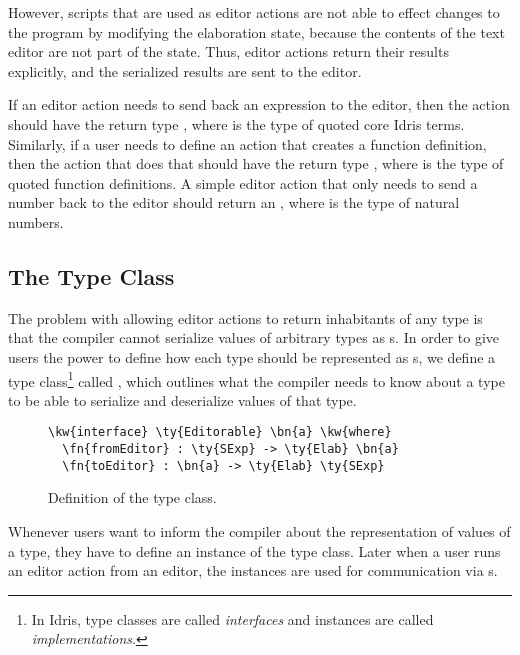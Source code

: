 However, \Elab{} scripts that are used as editor actions are not able to effect changes to the program by modifying the elaboration state, because the contents of the text editor are not part of the state.
Thus, editor actions return their results explicitly, and the serialized results are sent to the editor.

If an editor action needs to send back an expression to the editor, then the
action should have the return type \mbox{}, where  is the type of
quoted core Idris terms.
Similarly, if a user needs to define an action that creates a function definition,
then the action that does that should have the return type \mbox{},
where  is the type of quoted function definitions.
A simple editor action that only needs to send a number back
to the editor should return an \mbox{}, where  is the
type of natural numbers.

\subsection{The \Editorable{} Type Class}
\label{ssec:editorable}

The problem with allowing editor actions to return inhabitants of any
type is that the compiler cannot serialize values of arbitrary types
as \sexp{}s.  In order
to give users the power to define how each type should
be represented as \sexp{}s, we define a type class\footnote{In Idris,
  type classes are called \emph{interfaces} and instances are called
  \emph{implementations}.}  called \Editorable{}, which outlines what
the compiler needs to know about a type to be able to serialize and
deserialize values of that type.

\begin{figure}[H]
\begin{Verbatim}
\kw{interface} \ty{Editorable} \bn{a} \kw{where}
  \fn{fromEditor} : \ty{SExp} -> \ty{Elab} \bn{a}
  \fn{toEditor} : \bn{a} -> \ty{Elab} \ty{SExp}
\end{Verbatim}
\caption{Definition of the \Editorable{} type class.}
\label{code:editorable}
\end{figure}

Whenever users want to inform the compiler about the \sexp{}
representation of values of a type, they have to define an instance of the
\Editorable{} type class. Later when a user runs an editor action from an
editor, the \Editorable{} instances are used for communication via
\sexp{}s.

